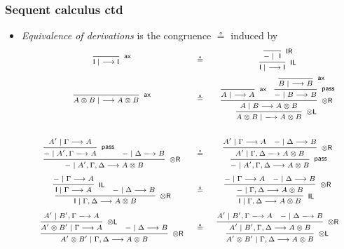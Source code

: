 \documentclass[10pt,t]{beamer}
\newcommand{\I}{\mathsf{I}}
\newcommand{\ot}{\otimes}
\newcommand{\n}{{-}}
\newcommand{\ax}{\mathsf{ax}}
\newcommand{\uf}{\mathsf{pass}}
\newcommand{\IL}{\I\mathsf{L}}
\newcommand{\otL}{\ot\mathsf{L}}
\newcommand{\IR}{\I\mathsf{R}}
\newcommand{\otR}{\ot\mathsf{R}}
\renewcommand{\vdash}{\longrightarrow}
\newcommand{\proofbox}[1]{\begin{tabular}{l} #1 \end{tabular}}
\begin{document}

\begin{frame}

\frametitle{Sequent calculus ctd}

\begin{itemize}

\item \emph{Equivalence of derivations} is the congruence $\circeq$
  induced by
\[
\scriptsize
\begin{array}{c@{\quad \circeq\quad}c}
\proofbox{
\infer[\ax]{\I \mid ~ \vdash \I}{
}
}
&
\proofbox{
\infer[\IL]{\I \mid ~ \vdash \I}{
  \infer[\IR]{\n \mid ~ \I}{
  }
}
}
\\[12pt]
\proofbox{
\infer[\ax]{A \ot B \mid ~ \vdash A \ot B}{
}
}
&
\proofbox{
\infer[\otL]{A \ot B \mid ~ \vdash A \ot B}{
  \infer[\otR]{A \mid B \vdash A \ot B}{
   \infer[\ax]{A \mid ~ \vdash A}{
   }
   &
   \infer[\uf]{\n \mid B \vdash B}{
     \infer[\ax]{B \mid ~ \vdash B}{
     }
   }
 }
} 
}
\\[36pt]
\proofbox{
\infer[\otR]{\n \mid A', \Gamma, \Delta \vdash A \otimes B}{
  \infer[\uf]{\n \mid A', \Gamma \vdash A}{
    A' \mid \Gamma \vdash A
  }
  &
  \n \mid \Delta \vdash B
}
}
&
\proofbox{
\infer[\uf]{\n \mid A', \Gamma, \Delta \vdash A \otimes B}{
  \infer[\otR]{A' \mid \Gamma, \Delta \vdash A \otimes B}{
    A' \mid \Gamma \vdash A
    &
    \n \mid \Delta \vdash B
  }
}
}
\\[18pt]
\proofbox{
\infer[\otR]{\I \mid \Gamma, \Delta \vdash A \otimes B}{
  \infer[\IL]{\I \mid \Gamma \vdash A}{
    \n \mid \Gamma \vdash A
  }
  &
  \n \mid \Delta \vdash B
}
}
&
\proofbox{
\infer[\IL]{\I \mid \Gamma, \Delta \vdash A \otimes B}{
  \infer[\otR]{\n \mid \Gamma, \Delta \vdash A \otimes B}{
    \n \mid \Gamma \vdash A
    &
    \n \mid \Delta \vdash B
  }
}
}
\\[18pt]
\proofbox{
\infer[\otR]{A' \ot B' \mid \Gamma, \Delta \vdash A \otimes B}{
  \infer[\otL]{A' \ot B' \mid \Gamma \vdash A}{
    A' \mid B', \Gamma \vdash A
  }
  &
  \n \mid \Delta \vdash B
}
}
&
\proofbox{
\infer[\otL]{A' \ot B' \mid \Gamma, \Delta \vdash A \otimes B}{
  \infer[\otR]{A' \mid B', \Gamma, \Delta \vdash A \otimes B}{
    A' \mid B', \Gamma \vdash A
    &
    \n \mid \Delta \vdash B
  }
}
}
\end{array}
\]

\end{itemize}

\end{frame}
\end{document}
